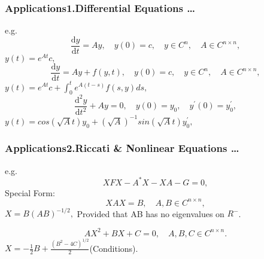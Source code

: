 \begin{frame}
    \frametitle{Applications\newline 1.Differential Equations \dots}
    e.g.
\[
    \frac{\mathrm{d} y}{\mathrm{d} t} = Ay, \quad y(0) =c,\quad y \in C^{n}, \quad A \in C^{n \times n},
\]
$y(t) = e^{At}c,$
\[
    \frac{\mathrm{d} y}{\mathrm{d} t} = Ay+f(y,t), \quad y(0) =c,\quad y \in C^{n}, \quad A \in C^{n \times n},
\]
$y(t) = e^{At}c+\int_{0}^{t}e^{A(t-s)}f(s,y)ds ,$
\[
    \frac{\mathrm{d^2} y}{\mathrm{d} t^2}+Ay= 0 ,\quad y(0) = y_0, \quad y^{'}(0) = y^{'}_0,
\]
$y(t) = cos(\sqrt{A}t)y_0 + (\sqrt{A})^{-1}sin(\sqrt{A}t)y^{'}_0 ,$
\end{frame}

\begin{frame}
    \frametitle{Applications\newline 2.Riccati \& Nonlinear Equations \dots}
    e.g.
\[
    XFX -A^*X -XA-G=0,
\]
Special Form:
\[
XAX =B , \quad A,B \in C^{n \times n},
\]
$ X =B(AB)^{-1/2},$   Provided that AB has no eigenvalues on $R^{-}$.

\[
AX^2+BX+C =0, \quad A,B,C \in C^{n \times n}.
\]
$X =-\frac{1}{2}B+ \frac{(B^2-4C)^{1/2}} {2}$(Conditions).
\end{frame}


